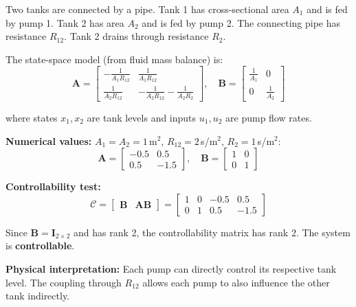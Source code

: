 \begin{example}
\label{ex:coupled_tanks_controllability}
Two tanks are connected by a pipe. Tank 1 has cross-sectional area $A_1$ and is fed by pump 1. Tank 2 has area $A_2$ and is fed by pump 2. The connecting pipe has resistance $R_{12}$. Tank 2 drains through resistance $R_2$.

The state-space model (from fluid mass balance) is:
\begin{equation}
\mathbf{A} = \begin{bmatrix} -\frac{1}{A_1 R_{12}} & \frac{1}{A_1 R_{12}} \\ \frac{1}{A_2 R_{12}} & -\frac{1}{A_2 R_{12}} - \frac{1}{A_2 R_2} \end{bmatrix}, \quad \mathbf{B} = \begin{bmatrix} \frac{1}{A_1} & 0 \\ 0 & \frac{1}{A_2} \end{bmatrix}
\end{equation}

where states $x_1, x_2$ are tank levels and inputs $u_1, u_2$ are pump flow rates.

\textbf{Numerical values:} $A_1 = A_2 = 1$\,m$^2$, $R_{12} = 2$\,s/m$^2$, $R_2 = 1$\,s/m$^2$:
\begin{equation}
\mathbf{A} = \begin{bmatrix} -0.5 & 0.5 \\ 0.5 & -1.5 \end{bmatrix}, \quad \mathbf{B} = \begin{bmatrix} 1 & 0 \\ 0 & 1 \end{bmatrix}
\end{equation}

\textbf{Controllability test:}
\begin{equation}
\mathcal{C} = \begin{bmatrix} \mathbf{B} & \mathbf{A}\mathbf{B} \end{bmatrix} = \begin{bmatrix} 1 & 0 & -0.5 & 0.5 \\ 0 & 1 & 0.5 & -1.5 \end{bmatrix}
\end{equation}

Since $\mathbf{B} = \mathbf{I}_{2 \times 2}$ and has rank 2, the controllability matrix has rank 2. The system is \textbf{controllable}.

\textbf{Physical interpretation:} Each pump can directly control its respective tank level. The coupling through $R_{12}$ allows each pump to also influence the other tank indirectly.


\end{example}
